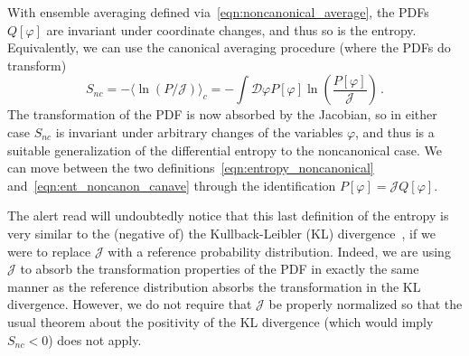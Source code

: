 \documentclass[11pt,a4paper]{article}
\begin{document}
With ensemble averaging defined via~\eqref{eqn:noncanonical_average}, the PDFs $Q[\varphi]$ are invariant under coordinate changes, and thus so is the entropy.
Equivalently, we can use the canonical averaging procedure (where the PDFs do transform)
\begin{equation}
  S_{nc} = -\langle \ln(P/\mathcal{J}) \rangle_c = - \int\mathcal{D}\varphi P[\varphi]\ln\left(\frac{P[\varphi]}{\mathcal{J}}\right) \, .
  \label{eqn:ent_noncanon_canave}
\end{equation}
The transformation of the PDF is now absorbed by the Jacobian, so in either case $S_{nc}$ is invariant under arbitrary changes of the variables $\varphi$, 
and thus is a suitable generalization of the differential entropy to the noncanonical case.
We can move between the two definitions~\eqref{eqn:entropy_noncanonical} and~\eqref{eqn:ent_noncanon_canave} through the identification $P[\varphi] = \mathcal{J}Q[\varphi]$.

The alert read will undoubtedly notice that this last definition of the entropy is very similar to the (negative of) the Kullback-Leibler (KL) divergence~\cite{Kullback:1951}, if we were to replace $\mathcal{J}$ with a reference probability distribution.
Indeed, we are using $\mathcal{J}$ to absorb the transformation properties of the PDF in exactly the same manner as the reference distribution absorbs the transformation in the KL divergence.
However, we do not require that $\mathcal{J}$ be properly normalized so that the usual theorem about the positivity of the KL divergence (which would imply $S_{nc} < 0$) does not apply.
\end{document}
